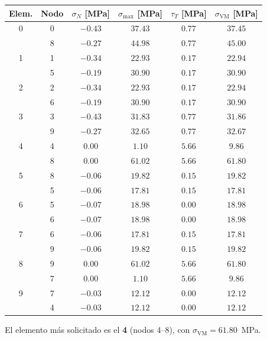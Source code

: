 \documentclass[11pt,a4paper]{article}
\begin{document}
\begin{center}
\begin{minipage}{\linewidth}
\centering
{}\label{tab:viga3d-tensiones}
\begin{tabular}{@{}cccccc@{}}
\toprule
Elem. & Nodo & $\sigma_N$ [MPa] & $\sigma_{\max}$ [MPa] & $\tau_T$ [MPa] & $\sigma_{\mathrm{VM}}$ [MPa] \\
\midrule
0 & 0 & $-0.43$ & $37.43$ & $0.77$ & $37.45$ \\
 & 8 & $-0.27$ & $44.98$ & $0.77$ & $45.00$ \\
1 & 1 & $-0.34$ & $22.93$ & $0.17$ & $22.94$ \\
 & 5 & $-0.19$ & $30.90$ & $0.17$ & $30.90$ \\
2 & 2 & $-0.34$ & $22.93$ & $0.17$ & $22.94$ \\
 & 6 & $-0.19$ & $30.90$ & $0.17$ & $30.90$ \\
3 & 3 & $-0.43$ & $31.83$ & $0.77$ & $31.86$ \\
 & 9 & $-0.27$ & $32.65$ & $0.77$ & $32.67$ \\
4 & 4 & $0.00$ & $1.10$ & $5.66$ & $9.86$ \\
 & 8 & $0.00$ & $61.02$ & $5.66$ & $61.80$ \\
5 & 8 & $-0.06$ & $19.82$ & $0.15$ & $19.82$ \\
 & 5 & $-0.06$ & $17.81$ & $0.15$ & $17.81$ \\
6 & 5 & $-0.07$ & $18.98$ & $0.00$ & $18.98$ \\
 & 6 & $-0.07$ & $18.98$ & $0.00$ & $18.98$ \\
7 & 6 & $-0.06$ & $17.81$ & $0.15$ & $17.81$ \\
 & 9 & $-0.06$ & $19.82$ & $0.15$ & $19.82$ \\
8 & 9 & $0.00$ & $61.02$ & $5.66$ & $61.80$ \\
 & 7 & $0.00$ & $1.10$ & $5.66$ & $9.86$ \\
9 & 7 & $-0.03$ & $12.12$ & $0.00$ & $12.12$ \\
 & 4 & $-0.03$ & $12.12$ & $0.00$ & $12.12$ \\
\bottomrule
\end{tabular}
\end{minipage}
\end{center}

El elemento más solicitado es el \textbf{4} (nodos 4--8), con $\sigma_{\mathrm{VM}}=61.80$~MPa.
\end{document}
